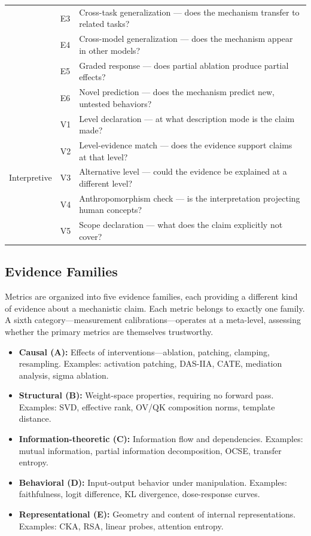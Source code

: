 \documentclass[10pt]{article}
\begin{document}
\begin{table}[t]
\begin{tabular}{@{}llp{6.5cm}@{}}
& E3 & Cross-task generalization --- does the mechanism transfer to related tasks? \\
& E4 & Cross-model generalization --- does the mechanism appear in other models? \\
& E5 & Graded response --- does partial ablation produce partial effects? \\
& E6 & Novel prediction --- does the mechanism predict new, untested behaviors? \\
\midrule
\multirow{5}{*}{Interpretive} & V1 & Level declaration --- at what description mode is the claim made? \\
& V2 & Level-evidence match --- does the evidence support claims at that level? \\
& V3 & Alternative level --- could the evidence be explained at a different level? \\
& V4 & Anthropomorphism check --- is the interpretation projecting human concepts? \\
& V5 & Scope declaration --- what does the claim explicitly not cover? \\
\bottomrule
\end{tabular}
\end{table}

\subsection{Evidence Families}
\label{sec:evidence-families}

Metrics are organized into five evidence families, each providing a different kind of evidence about a mechanistic claim. Each metric belongs to exactly one family. A sixth category---measurement calibrations---operates at a meta-level, assessing whether the primary metrics are themselves trustworthy.

\begin{itemize}[nosep]
    \item \textbf{Causal (A):} Effects of interventions---ablation, patching, clamping, resampling. Examples: activation patching, DAS-IIA, CATE, mediation analysis, sigma ablation.
    \item \textbf{Structural (B):} Weight-space properties, requiring no forward pass. Examples: SVD, effective rank, OV/QK composition norms, template distance.
    \item \textbf{Information-theoretic (C):} Information flow and dependencies. Examples: mutual information, partial information decomposition, OCSE, transfer entropy.
    \item \textbf{Behavioral (D):} Input-output behavior under manipulation. Examples: faithfulness, logit difference, KL divergence, dose-response curves.
    \item \textbf{Representational (E):} Geometry and content of internal representations. Examples: CKA, RSA, linear probes, attention entropy.
\end{itemize}
\end{document}
